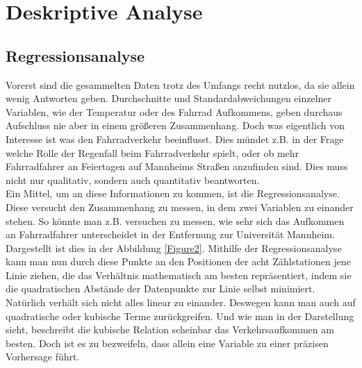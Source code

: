 \documentclass[a4paper,12pt]{thesis}
\begin{document}
\chapter{Deskriptive Analyse}

\section{Regressionsanalyse}

Vorerst sind die gesammelten Daten trotz des Umfangs recht nutzlos, da sie allein wenig Antworten geben. Durchschnitte und Standardabweichungen einzelner Variablen, wie der Temperatur oder des Fahrrad Aufkommens, geben durchaus Aufschluss nie aber in einem größeren Zusammenhang. Doch was eigentlich von Interesse ist was den Fahrradverkehr beeinflusst. Dies mündet z.B. in der Frage welche Rolle der Regenfall beim Fahrradverkehr spielt, oder ob mehr Fahrradfahrer an Feiertagen auf Mannheims Straßen anzufinden sind. Dies muss nicht nur qualitativ, sondern auch quantitativ beantworten.\\
Ein Mittel, um an diese Informationen zu kommen, ist die Regressionsanalyse. Diese versucht den Zusammenhang zu messen, in dem zwei Variablen zu einander stehen. So könnte man z.B. versuchen zu messen, wie sehr sich das Aufkommen an Fahrradfahrer unterscheidet in der Entfernung zur Universität Mannheim. Dargestellt ist dies in der Abbildung \ref{Figure2}. Mithilfe der Regressionsanalyse kann man nun durch diese Punkte an den Positionen der acht Zählstationen jene Linie ziehen, die das Verhältnis mathematisch am besten repräsentiert, indem sie die quadratischen Abstände der Datenpunkte zur Linie selbst minimiert. Natürlich verhält sich nicht alles linear zu einander. Deswegen kann man auch auf quadratische oder kubische Terme zurückgreifen. Und wie man in der Darstellung sieht, beschreibt die kubische Relation scheinbar das Verkehrsaufkommen am besten. Doch ist es zu bezweifeln, dass allein eine Variable zu einer präzisen Vorhersage führt.\\
\end{document}
